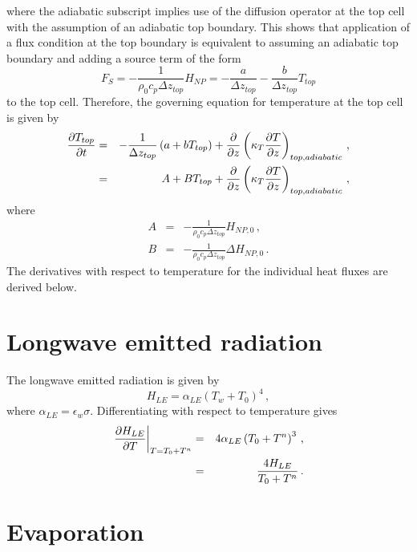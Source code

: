 \documentclass[12pt]{article}
\begin{document}
where the adiabatic subscript implies use of the diffusion operator at the
top cell with the assumption of an adiabatic top boundary.  This shows
that application of a flux condition at the top boundary is equivalent to
assuming an adiabatic top boundary and adding a source term of the form
\[
F_S = -\frac{1}{\rho_0 c_p \Delta z_{top}}H_{NP} = -\frac{a}{\Delta z_{top}} - \frac{b}{\Delta z_{top}} T_{top}
\]
to the top cell.
Therefore, the governing equation for temperature at the top cell is given by
\begin{eqnarray*}
\frac{\partial{T_{top}}}{\partial{t}} &=& -\frac{1}{\Delta z_{top}}\left(a + b T_{top}\right)
               +\frac{\partial{}}{\partial{z}}\left(\kappa_T\frac{\partial{T}}{\partial{z}}\right)_{top,adiabatic}\,,\\
               &=& A + B T_{top}
               +\frac{\partial{}}{\partial{z}}\left(\kappa_T\frac{\partial{T}}{\partial{z}}\right)_{top,adiabatic}\,,
\end{eqnarray*}
where
\begin{eqnarray*}
A &=& -\frac{1}{\rho_0 c_p \Delta z_{top}}H_{NP,0}\,,\\
B &=& -\frac{1}{\rho_0 c_p \Delta z_{top}}\Delta H_{NP,0}\,.
\end{eqnarray*}
The derivatives with respect to temperature for the individual heat fluxes
are derived below. 

\section{Longwave emitted radiation}

The longwave emitted radiation is given by
\[
H_{LE} = \alpha_{LE}\left(T_w + T_0\right)^4\,,
\]
where $\alpha_{LE}=\epsilon_w\sigma$.
Differentiating with respect to temperature gives
\begin{eqnarray*}
\left.\frac{\partial{H_{LE}}}{\partial{T}}\right|_{T=T_0 + T^n} &=& 4\alpha_{LE}\left(T_0 + T^n\right)^3 \,,\\
                                         &=& \frac{4H_{LE}}{T_0 + T^n}\,.
\end{eqnarray*}

\section{Evaporation}
\end{document}
